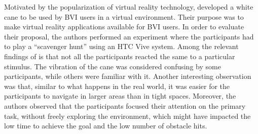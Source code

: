 Motivated by the popularization of virtual reality technology, \cite{siu2020virtual} developed a white cane to be used by BVI users in a virtual environment. Their purpose was to make virtual reality applications available for BVI users. In order to evaluate their proposal, the authors performed an experiment where the participants had to play a “scavenger hunt” using an HTC Vive system. Among the relevant findings of \cite{siu2020virtual} is that not all the participants reacted the same to a particular stimulus. The vibration of the cane was considered confusing by some participants, while others were familiar with it. Another interesting observation was that, similar to what happens in the real world, it was easier for the participants to navigate in larger areas than in tight spaces. Moreover, the authors observed that the participants focused their attention on the primary task, without freely exploring the environment, which might have impacted the low time to achieve the goal and the low number of obstacle hits. 